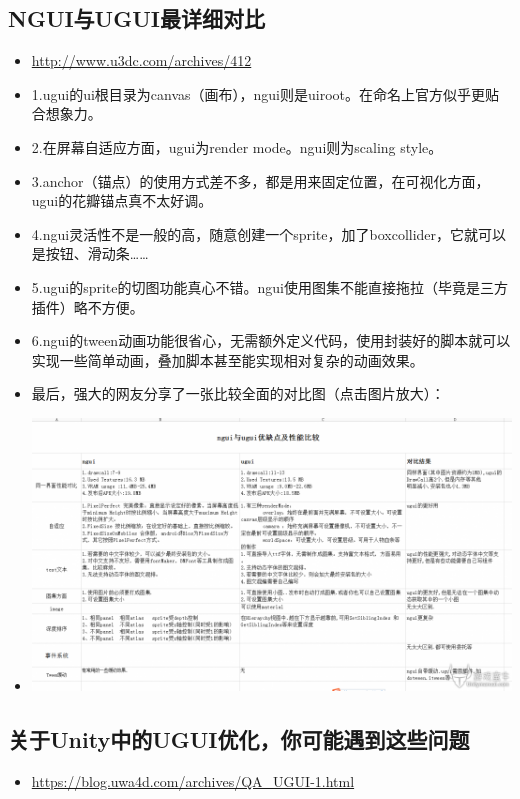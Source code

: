 \documentclass[9pt, b5paper]{article}
\begin{document}
\subsection{NGUI与UGUI最详细对比}
\label{sec:orgaa0d517}
\begin{itemize}
\item \url{http://www.u3dc.com/archives/412}
\item 1.ugui的ui根目录为canvas（画布），ngui则是uiroot。在命名上官方似乎更贴合想象力。
\item 2.在屏幕自适应方面，ugui为render mode。ngui则为scaling style。
\item 3.anchor（锚点）的使用方式差不多，都是用来固定位置，在可视化方面，ugui的花瓣锚点真不太好调。
\item 4.ngui灵活性不是一般的高，随意创建一个sprite，加了boxcollider，它就可以是按钮、滑动条……
\item 5.ugui的sprite的切图功能真心不错。ngui使用图集不能直接拖拉（毕竟是三方插件）略不方便。
\item 6.ngui的tween动画功能很省心，无需额外定义代码，使用封装好的脚本就可以实现一些简单动画，叠加脚本甚至能实现相对复杂的动画效果。
\item 最后，强大的网友分享了一张比较全面的对比图（点击图片放大）：
\item \begin{center}
\includegraphics[width=.9\linewidth]{./pic/ngui-ugui.png}
\end{center}
\end{itemize}
\subsection{关于Unity中的UGUI优化，你可能遇到这些问题}
\label{sec:org750f515}
\begin{itemize}
\item \url{https://blog.uwa4d.com/archives/QA\_UGUI-1.html}
\end{itemize}
\end{document}
